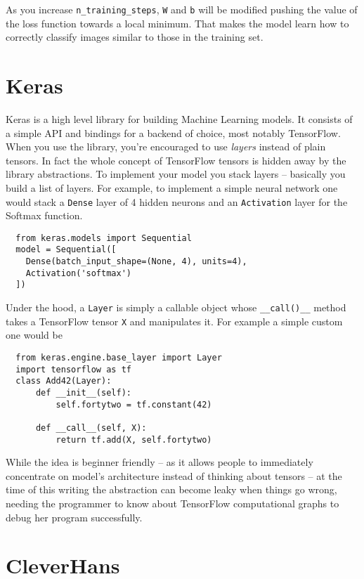As you increase \texttt{n\_training\_steps}, \texttt{W} and \texttt{b}
will be modified pushing the value of the loss function towards a local
minimum. That makes the model learn how to correctly classify images
similar to those in the training set.

\section{Keras}
\label{sec:keras}

Keras is a high level library for building Machine Learning models. It
consists of a simple API and bindings for a backend of choice, most
notably TensorFlow. When you use the library, you're encouraged to use
\emph{layers} instead of plain tensors. In fact the whole concept of
TensorFlow tensors is hidden away by the library abstractions. To
implement your model you stack layers -- basically you build a list of
layers. For example, to implement a simple neural network one would
stack a \texttt{Dense} layer of 4 hidden neurons and an
\texttt{Activation} layer for the Softmax function.

\begin{verbatim}
  from keras.models import Sequential
  model = Sequential([
    Dense(batch_input_shape=(None, 4), units=4),
    Activation('softmax')
  ])
\end{verbatim}

Under the hood, a \texttt{Layer} is simply a callable object whose
\texttt{\_\_call()\_\_} method takes a TensorFlow tensor \texttt{X} and
manipulates it. For example a simple custom one would be
\begin{verbatim}
  from keras.engine.base_layer import Layer
  import tensorflow as tf
  class Add42(Layer):
      def __init__(self):
          self.fortytwo = tf.constant(42)

      def __call__(self, X):
          return tf.add(X, self.fortytwo)
\end{verbatim}

While the idea is beginner friendly -- as it allows people to
immediately concentrate on model's architecture instead of thinking
about tensors -- at the time of this writing the abstraction can become
leaky when things go wrong, needing the programmer to know about
TensorFlow computational graphs to debug her program successfully.

\section{CleverHans}
\label{sec:cleverhans}

